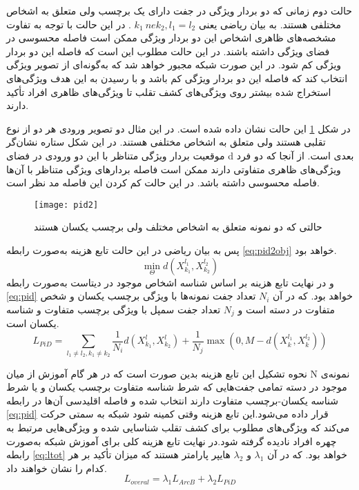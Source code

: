 حالت دوم زمانی که دو بردار ویژگی در جفت دارای یک برچسب ولی متعلق به اشخاص مختلفی هستند. به بیان ریاضی یعنی  
  $k_1 \ ne k_2 , l_1 = l_2 $
. در این حالت با توجه به تفاوت مشخصه‌های ظاهری اشخاص این دو بردار ویژگی ممکن است فاصله محسوسی در فضای ویژگی داشته باشند. در این حالت مطلوب این است که فاصله این دو بردار ویژگی کم شود. در این صورت شبکه مجبور خواهد شد که به‌گونه‌ای از تصویر ویژگی انتخاب کند که فاصله این دو بردار ویژگی کم باشد و با رسیدن به این هدف ویژگی‌های استخراج شده بیشتر روی ویژگی‌های کشف تقلب تا ویژگی‌های ظاهری افراد تأکید دارند.

در شکل
\ref{fig:pid2}
این حالت نشان داده شده است. در این مثال دو تصویر ورودی هر دو از نوع تقلبی هستند ولی متعلق به اشخاص مختلفی هستند. در این شکل ستاره نشان‌گر موقعیت بردار ویژگی متناظر با این دو ورودی در فضای d بعدی است. از آنجا که دو فرد ویژگی‌های ظاهری متفاوتی دارند ممکن است فاصله بردارهای ویژگی متناظر با آن‌ها فاصله محسوسی داشته باشد. در این حالت کم کردن این فاصله مد نظر است. 
 \begin{figure}[ht]
	\centerline{\texttt{[image: pid2]}}
	\caption{حالتی که دو نمونه متعلق به اشخاص مختلف ولی برچسب یکسان هستند}
	\label{fig:pid2}
\end{figure}
پس به بیان ریاضی در این حالت تابع هزینه به‌صورت رابطه
\ref{eq:pid2obj}
خواهد بود.
\begin{equation}\label{eq:pid2obj}
\min_{\Theta} {d( X_{k_1}^{l_1},X_{k_2}^{l_2} )} 
\end{equation}
  و در نهایت تابع هزینه بر اساس شناسه اشخاص موجود در دیتاست به‌صورت رابطه
\ref{eq:pid}
  خواهد بود. که در آن  
 $N_i$
   تعداد جفت نمونه‌ها با ویژگی برچسب یکسان و شخص متفاوت در دسته است و 
   $N_j$
       تعداد جفت سمپل با ویژگی برچسب متفاوت و شناسه یکسان است.
\begin{equation}\label{eq:pid}
  	L_{PiD} = \sum_{l_1 \ne l_2,k_1 \ne k_2}{\frac{1}{N_i}d( X_{k_1}^{l},X_{k_2}^{l})+\frac{1}{N_j}\max(0,M-d( X_{k}^{l_1},X_{k}^{l_2} ))}
\end{equation}

 نحوه تشکیل این تابع هزینه بدین صورت است که در هر گام آموزش از میان N نمونه‌ی موجود در دسته تمامی جفت‌هایی که شرط شناسه متفاوت برچسب یکسان و یا شرط شناسه یکسان-برچسب متفاوت دارند انتخاب شده و فاصله اقلیدسی آن‌ها در رابطه
\ref{eq:pid}
 قرار داده می‌شود.این تابع هزینه وقتی کمینه شود شبکه به سمتی حرکت می‌کند که ویژگی‌های مطلوب برای کشف تقلب شناسایی شده و ویژگی‌هایی مرتبط به چهره افراد نادیده گرفته شود.در نهایت تابع هزینه کلی برای آموزش شبکه به‌صورت رابطه
\ref{eq:ltot}
 خواهد بود. که در آن 
 $\lambda_1$
 و
 $\lambda_2$
   هایپر پارامتر هستند که میزان تأکید بر هر کدام را نشان خواهند داد.
\begin{equation}\label{eq:ltot}
	L_{overal} = \lambda_1L_{ArcB} + \lambda_2L_{PiD}
\end{equation}

